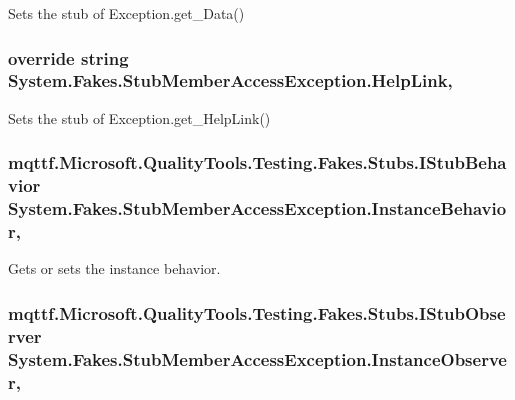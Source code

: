 Sets the stub of Exception.\-get\-\_\-\-Data()

\hypertarget{class_system_1_1_fakes_1_1_stub_member_access_exception_a95cf4903b64a0fa85490936468426b87}{
\subsubsection[{Help\-Link}]{\setlength{\rightskip}{0pt plus 5cm}override string System.\-Fakes.\-Stub\-Member\-Access\-Exception.\-Help\-Link\hspace{0.3cm}{\ttfamily [get]}, {\ttfamily [set]}}}\label{class_system_1_1_fakes_1_1_stub_member_access_exception_a95cf4903b64a0fa85490936468426b87}


Sets the stub of Exception.\-get\-\_\-\-Help\-Link()

\hypertarget{class_system_1_1_fakes_1_1_stub_member_access_exception_a00f973749bba2668475ccfff23be2479}{
\subsubsection[{Instance\-Behavior}]{\setlength{\rightskip}{0pt plus 5cm}mqttf.\-Microsoft.\-Quality\-Tools.\-Testing.\-Fakes.\-Stubs.\-I\-Stub\-Behavior System.\-Fakes.\-Stub\-Member\-Access\-Exception.\-Instance\-Behavior\hspace{0.3cm}{\ttfamily [get]}, {\ttfamily [set]}}}\label{class_system_1_1_fakes_1_1_stub_member_access_exception_a00f973749bba2668475ccfff23be2479}


Gets or sets the instance behavior.

\hypertarget{class_system_1_1_fakes_1_1_stub_member_access_exception_ab8405985c3e11a66d4a5864f1e1cfbd1}{
\subsubsection[{Instance\-Observer}]{\setlength{\rightskip}{0pt plus 5cm}mqttf.\-Microsoft.\-Quality\-Tools.\-Testing.\-Fakes.\-Stubs.\-I\-Stub\-Observer System.\-Fakes.\-Stub\-Member\-Access\-Exception.\-Instance\-Observer\hspace{0.3cm}{\ttfamily [get]}, {\ttfamily [set]}}}\label{class_system_1_1_fakes_1_1_stub_member_access_exception_ab8405985c3e11a66d4a5864f1e1cfbd1}


